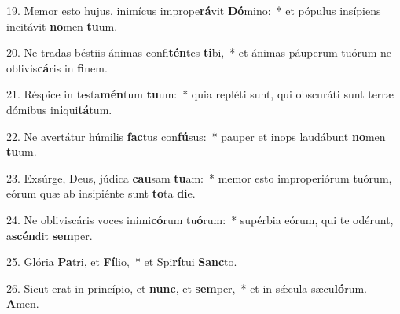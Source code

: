 19. Memor esto hujus, inimícus imprope\textbf{rá}vit \textbf{Dó}mino:~*  et pópulus insípiens incitávit \textbf{no}men \textbf{tu}um.\

20. Ne tradas béstiis ánimas confi\textbf{tén}tes \textbf{ti}bi,~*  et ánimas páuperum tuórum ne oblivis\textbf{cá}ris in \textbf{fi}nem.\

21. Réspice in testa\textbf{mén}tum \textbf{tu}um:~*  quia repléti sunt, qui obscuráti sunt terræ dómibus in\textbf{i}qui\textbf{tá}tum.\

22. Ne avertátur húmilis \textbf{fac}tus con\textbf{fú}sus:~*  pauper et inops laudábunt \textbf{no}men \textbf{tu}um.\

23. Exsúrge, Deus, júdica \textbf{cau}sam \textbf{tu}am:~*  memor esto improperiórum tuórum, eórum quæ ab insipiénte sunt \textbf{to}ta \textbf{di}e.\

24. Ne obliviscáris voces inimi\textbf{có}rum tu\textbf{ó}rum:~*  supérbia eórum, qui te odérunt, a\textbf{scén}dit \textbf{sem}per.\

25. Glória \textbf{Pa}tri, et \textbf{Fí}lio,~*  et Spi\textbf{rí}tui \textbf{Sanc}to.\

26. Sicut erat in princípio, et \textbf{nunc}, et \textbf{sem}per,~*  et in sǽcula sæcu\textbf{ló}rum. \textbf{A}men.\

